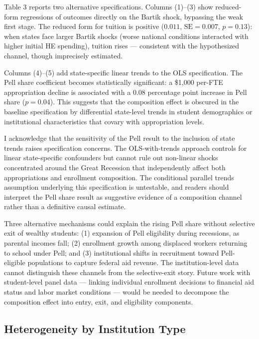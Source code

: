 \documentclass[12pt]{article}
\begin{document}


Table 3 reports two alternative specifications. Columns (1)--(3) show reduced-form regressions of outcomes directly on the Bartik shock, bypassing the weak first stage. The reduced form for tuition is positive ($0.011$, $\text{SE} = 0.007$, $p = 0.13$): when states face larger Bartik shocks (worse national conditions interacted with higher initial HE spending), tuition rises --- consistent with the hypothesized channel, though imprecisely estimated.

Columns (4)--(5) add state-specific linear trends to the OLS specification. The Pell share coefficient becomes statistically significant: a \$1,000 per-FTE appropriation decline is associated with a 0.08 percentage point increase in Pell share ($p = 0.04$). This suggests that the composition effect is obscured in the baseline specification by differential state-level trends in student demographics or institutional characteristics that covary with appropriation levels.

I acknowledge that the sensitivity of the Pell result to the inclusion of state trends raises specification concerns. The OLS-with-trends approach controls for linear state-specific confounders but cannot rule out non-linear shocks concentrated around the Great Recession that independently affect both appropriations and enrollment composition. The conditional parallel trends assumption underlying this specification is untestable, and readers should interpret the Pell share result as suggestive evidence of a composition channel rather than a definitive causal estimate.

Three alternative mechanisms could explain the rising Pell share without selective exit of wealthy students: (1) expansion of Pell eligibility during recessions, as parental incomes fall; (2) enrollment growth among displaced workers returning to school under Pell; and (3) institutional shifts in recruitment toward Pell-eligible populations to capture federal aid revenue. The institution-level data cannot distinguish these channels from the selective-exit story. Future work with student-level panel data --- linking individual enrollment decisions to financial aid status and labor market conditions --- would be needed to decompose the composition effect into entry, exit, and eligibility components.

\subsection{Heterogeneity by Institution Type}
\end{document}

